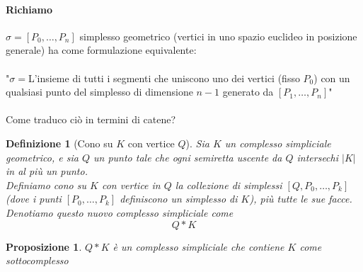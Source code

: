 \documentclass[a4paper]{report}
\newtheorem{proposition}{Proposizione}
\newtheorem{definition}{Definizione}
\begin{document}
\paragraph{Richiamo} $\sigma=[P_0,\dots,P_n]$ simplesso geometrico (vertici in uno spazio euclideo in posizione generale) ha come formulazione equivalente:\\\\
"$\sigma=$L'insieme di tutti i segmenti che uniscono uno dei vertici (fisso $P_0$) con un qualsiasi punto del simplesso di dimensione $n-1$ generato da $[P_1,\dots,P_n]$"\\\\
Come traduco ciò in termini di catene?
\begin{definition}[Cono su $K$ con vertice $Q$]
    Sia $K$ un complesso simpliciale geometrico, e sia $Q$ un punto tale che ogni semiretta uscente da $Q$ intersechi $|K|$ in al più un punto.\\
    Definiamo cono su $K$ con vertice in $Q$ la collezione di simplessi $[Q,P_0,\dots,P_k]$ (dove i punti $[P_0,\dots,P_k]$ definiscono un simplesso di $K$), più tutte le sue facce.\\
    Denotiamo questo nuovo complesso simpliciale come
    \[
        Q*K    
    \]
\end{definition}
\begin{proposition}
    $Q*K$ è un complesso simpliciale che contiene $K$ come sottocomplesso
\end{proposition}
\end{document}
